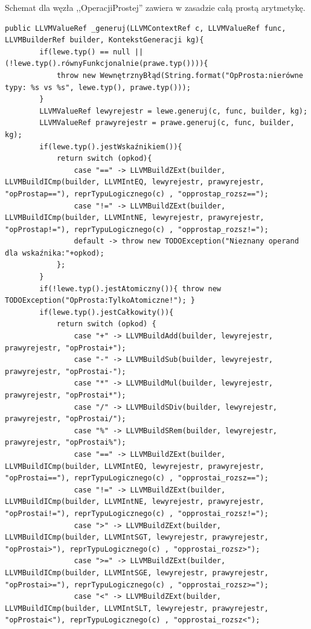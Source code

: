 Schemat dla węzła ,,OperacjiProstej'' zawiera w zasadzie całą prostą arytmetykę.

\begin{lstlisting}[basicstyle=\scriptsize]
    public LLVMValueRef _generuj(LLVMContextRef c, LLVMValueRef func, LLVMBuilderRef builder, KontekstGeneracji kg){
        if(lewe.typ() == null || (!lewe.typ().równyFunkcjonalnie(prawe.typ()))){
            throw new WewnętrznyBłąd(String.format("OpProsta:nierówne typy: %s vs %s", lewe.typ(), prawe.typ()));
        }
        LLVMValueRef lewyrejestr = lewe.generuj(c, func, builder, kg);
        LLVMValueRef prawyrejestr = prawe.generuj(c, func, builder, kg);
        if(lewe.typ().jestWskaźnikiem()){
            return switch (opkod){
                case "==" -> LLVMBuildZExt(builder, LLVMBuildICmp(builder, LLVMIntEQ, lewyrejestr, prawyrejestr, "opProstap=="), reprTypuLogicznego(c) , "opprostap_rozsz==");
                case "!=" -> LLVMBuildZExt(builder, LLVMBuildICmp(builder, LLVMIntNE, lewyrejestr, prawyrejestr, "opProstap!="), reprTypuLogicznego(c) , "opprostap_rozsz!=");
                default -> throw new TODOException("Nieznany operand dla wskaźnika:"+opkod);
            };
        }
        if(!lewe.typ().jestAtomiczny()){ throw new TODOException("OpProsta:TylkoAtomiczne!"); }
        if(lewe.typ().jestCałkowity()){
            return switch (opkod) {
                case "+" -> LLVMBuildAdd(builder, lewyrejestr, prawyrejestr, "opProstai+");
                case "-" -> LLVMBuildSub(builder, lewyrejestr, prawyrejestr, "opProstai-");
                case "*" -> LLVMBuildMul(builder, lewyrejestr, prawyrejestr, "opProstai*");
                case "/" -> LLVMBuildSDiv(builder, lewyrejestr, prawyrejestr, "opProstai/");
                case "%" -> LLVMBuildSRem(builder, lewyrejestr, prawyrejestr, "opProstai%");
                case "==" -> LLVMBuildZExt(builder, LLVMBuildICmp(builder, LLVMIntEQ, lewyrejestr, prawyrejestr, "opProstai=="), reprTypuLogicznego(c) , "opprostai_rozsz==");
                case "!=" -> LLVMBuildZExt(builder, LLVMBuildICmp(builder, LLVMIntNE, lewyrejestr, prawyrejestr, "opProstai!="), reprTypuLogicznego(c) , "opprostai_rozsz!=");
                case ">" -> LLVMBuildZExt(builder, LLVMBuildICmp(builder, LLVMIntSGT, lewyrejestr, prawyrejestr, "opProstai>"), reprTypuLogicznego(c) , "opprostai_rozsz>");
                case ">=" -> LLVMBuildZExt(builder, LLVMBuildICmp(builder, LLVMIntSGE, lewyrejestr, prawyrejestr, "opProstai>="), reprTypuLogicznego(c) , "opprostai_rozsz>=");
                case "<" -> LLVMBuildZExt(builder, LLVMBuildICmp(builder, LLVMIntSLT, lewyrejestr, prawyrejestr, "opProstai<"), reprTypuLogicznego(c) , "opprostai_rozsz<");

\end{lstlisting}
